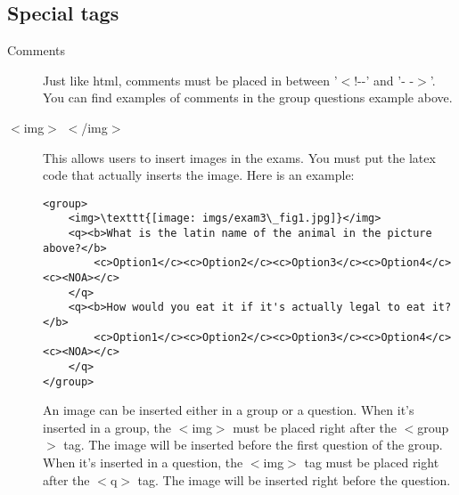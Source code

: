 \documentclass[11pt,letterpaper]{article}
\begin{document}
\subsection{Special tags}
\begin{description}
    \item[Comments] Just like html, comments must be placed in between '$<$!{-}{-}' and '{-} {-}$>$'. You can find examples of comments in the group questions example above. 

    \item[$<$img$>$ $<$/img$>$] This allows users to insert images in the exams. You must put the latex code that actually inserts the image. Here is an example: 
\begin{verbatim}
<group>
    <img>\texttt{[image: imgs/exam3\_fig1.jpg]}</img>
    <q><b>What is the latin name of the animal in the picture above?</b>
        <c>Option1</c><c>Option2</c><c>Option3</c><c>Option4</c><c><NOA></c>
    </q>
    <q><b>How would you eat it if it's actually legal to eat it?</b>
        <c>Option1</c><c>Option2</c><c>Option3</c><c>Option4</c><c><NOA></c>
    </q>
</group>
\end{verbatim}
An image can be inserted either in a group or a question. When it's inserted in a group, the $<$img$>$ must be placed right after the $<$group$>$ tag. The image will be inserted before the first question of the group. When it's inserted in a question, the $<$img$>$ tag must be placed right after the $<$q$>$ tag. The image will be inserted right before the question.

 
\end{description}
\end{document}
